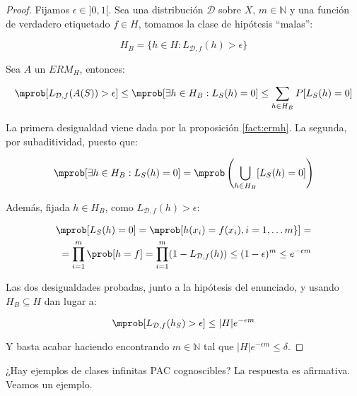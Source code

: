   \begin{proof}
  Fijamos $\epsilon \in ]0,1[$. Sea una distribución $\mathcal{D}$ sobre $X$, $m\in \mathbb{N}$ y una función de verdadero 
  etiquetado $f\in H$, tomamos la clase de hipótesis ``malas'':

  \[H_B = \{h\in H: L_{\mathcal{D},f}(h) > \epsilon\}\]

  Sea $A$ un $ERM_{H}$, entonces:

  \[\mprob [L_{\mathcal{D},f}(A(S)) > \epsilon] \le \mprob 
  [\exists h\in H_B : L_S(h) = 0] \le \sum_{h\in H_B} P [L_S(h) = 0] \]

  La primera desigualdad viene dada por la proposición \ref{fact:ermh}. La segunda, por subaditividad, puesto que:
  
  \[\mprob [\exists h\in H_B : L_S(h) = 0] = \mprob \left(\underset{h\in H_B}{\bigcup} [L_S(h) = 0]\right)\]

  Además, fijada $h\in H_B$, como $L_{\mathcal{D},f}(h) > \epsilon$:

  \begin{align*}
  \mprob[L_S(h) = 0] = \mprob[h(x_i) = f(x_i), i =1,\ldots m\}] =\\
  = \prod_{i=1}^m \prob[h = f] = \prod_{i=1}^m (1 - L_{\mathcal{D},f}(h)) \le (1-\epsilon)^m \le e^{-\epsilon m}
  \end{align*}


  Las dos desigualdades probadas, junto a la hipótesis del enunciado, y usando $H_B \subseteq H$ dan lugar a:

  \[\mprob[L_{\mathcal{D},f}(h_S) > \epsilon] \le |H|e^{-\epsilon m}\]
  
  Y basta acabar haciendo encontrando $m\in \mathbb{N}$ tal que $|H|e^{-\epsilon m} \le \delta$.
  \end{proof}

¿Hay ejemplos de clases infinitas PAC cognoscibles? La respuesta es afirmativa. Veamos un ejemplo.

